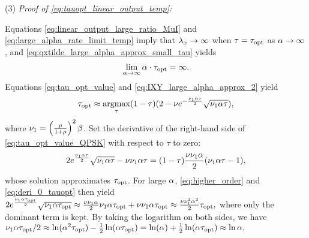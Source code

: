 \documentclass[12pt, draftclsnofoot,journal,onecolumn]{IEEEtran}
\begin{document}
{\noindent (3)  \emph{Proof of \eqref{eq:tauopt_linear_output_temp}:}

Equations \eqref{eq:linear_output_large_ratio_MuI} and \eqref{eq:large_alpha_rate_limit_temp} imply that $\lambda_x\to\infty$ when $\tau=\tau_{{\rm opt}}$ as $\alpha\to\infty$, and
\eqref{eq:qxtilde_large_alpha_approx_small_tau} yields
\begin{align}
    \lim_{\alpha\to\infty}\alpha\cdot\tau_{{\rm opt}}=\infty.
    \label{eq:higher_order}
\end{align}
Equations \eqref{eq:tau_opt_value} and \eqref{eq:IXY_large_alpha_approx_2} yield
\begin{align}
    \tau_{{\rm opt}}\approx\mathop{\mathrm{argmax}}_{\tau}(1-\tau)(2-\nu e^{-\frac{\nu_1\alpha\tau}{2}}\sqrt{\nu_1\alpha\tau}),
    \label{eq:tau_opt_value_QPSK}
\end{align}
where $\nu_1=\left(\frac{\rho}{1+\rho}\right)^2\beta$. %
Set the derivative of the right-hand side of \eqref{eq:tau_opt_value_QPSK} with respect to $\tau$ to zero:
\begin{align}
    2e^{\frac{\nu_1\alpha\tau}{2}}\sqrt{\nu_1\alpha\tau}-\nu\nu_1\alpha\tau=(1-\tau)\frac{\nu \nu_1\alpha}{2}(\nu_1\alpha\tau-1),
    \label{eq:deri_0_tauopt}
\end{align}
whose solution approximates $\tau_{{\rm opt}}$. For large $\alpha$, \eqref{eq:higher_order} and \eqref{eq:deri_0_tauopt} then yield $2e^{\frac{\nu_1\alpha\tau_{{\rm opt}}}{2}}\sqrt{\nu_1\alpha\tau_{{\rm opt}}}\approx\frac{\nu \nu_1\alpha}{2}\nu_1\alpha\tau_{{\rm opt}} +\nu\nu_1\alpha\tau_{{\rm opt}} \approx\frac{\nu \nu_1^2\alpha^2}{2}\tau_{{\rm opt}},$ 
where only the dominant term is kept.  By taking the logarithm on both sides, we have ${\nu_1\alpha\tau_{{\rm opt}}}/{2}\approx\ln(\alpha^2\tau_{{\rm opt}})-\frac{1}{2}\ln(\alpha\tau_{{\rm opt}})=\ln(\alpha)+\frac{1}{2}\ln(\alpha\tau_{{\rm opt}})\approx\ln\alpha,$ 
\comm{
\begin{align*}

\end{align*}}}
\end{document}

